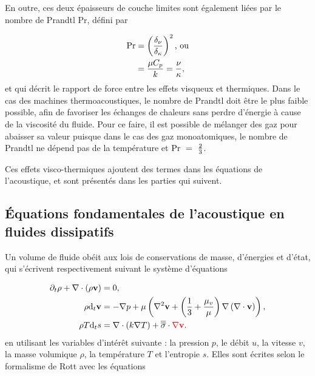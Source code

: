 En outre, ces deux épaisseurs de couche limites sont également liées par le nombre de Prandtl $\mathrm{Pr}$, défini par

\begin{subequations}
	\begin{align}
		\mathrm{Pr} &= \left(\frac{\delta_{\nu}}{\delta_{\kappa}}\right)^2 \text{, ou} \label{eq:Prandtl_delta}\\
				&= \frac{\mu C_{p}}{k} = \frac{\nu}{\kappa}, \label{eq:Prandtl_MuK_NuKappa}
	\end{align}
	\label{eq:Prandtl}%
\end{subequations}
et qui décrit le rapport de force entre les effets visqueux et thermiques. Dans le cas des machines thermoacoustiques, le nombre de Prandtl doit être le plus faible possible, afin de favoriser les échanges de chaleurs sans perdre d'énergie à cause de la viscosité du fluide. Pour ce faire, il est possible de mélanger des gaz pour abaisser sa valeur \cite{belcher_working_1999} puisque dans le cas des gaz monoatomiques, le nombre de Prandtl ne dépend pas de la température et $\mathrm{Pr}~=~\frac{2}{3}$.

Ces effets visco-thermiques ajoutent des termes dans les équations de l'acoustique, et sont présentés dans les parties qui suivent.

\subsection{\'Equations fondamentales de l'acoustique en fluides dissipatifs}

Un volume de fluide obéit aux lois de conservations de masse, d'énergies et d'état, qui s'écrivent respectivement suivant le système d'équations

\begin{subequations}
	\begin{align}
		\partial_t \rho + \nabla \cdot (\rho \mathbf v) &= 0, \label{eq:ConservMass}\\
		\rho \mathrm{d}_t \mathbf v &= -\nabla p + \mu\left( \nabla^2 \mathbf v +\left(\frac13+\frac{\mu_v}{\mu} \right)\nabla\left(\nabla \cdot \mathbf v\right)\right), \label{eq:NavierStokes_QteMvt_base}\\
		\rho T\mathrm{d}_t s &= \nabla\cdot (k \nabla T) + \overline{\overline{\sigma}}\cdot \textcolor{red}{\nabla \mathbf v}. \label{eq:ConservEnergie}
	\end{align}
\end{subequations}
en utilisant les variables d'intérêt suivante : la pression $p$, le débit $u$, la vitesse $v$, la masse volumique $\rho$, la température $T$ et l'entropie $s$. Elles sont écrites selon le formalisme de Rott avec les équations

